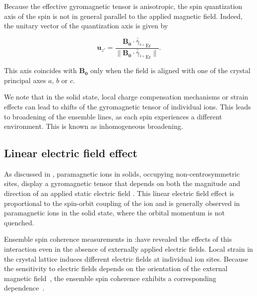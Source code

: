 Because the effective gyromagnetic tensor is anisotropic, the spin quantization axis of the spin is not in general parallel to the applied magnetic field. Indeed, the unitary vector of the quantization axis is given by

\begin{equation}
    \mathbf{u}_{z'} = \frac{\mathbf{B_0}\cdot \bar{\bar{\gamma}}_{^{3+}\text{Er}}}{\lVert \mathbf{B_0}\cdot \bar{\bar{\gamma}}_{^{3+}\text{Er}}\rVert}.
\end{equation}

This axis coincides with $\mathbf{B_0}$ only when the field is aligned with one of the crystal principal axes $a$, $b$ or $c$.

We note that in the solid state, local charge compensation mechanisms or strain effects can lead to shifts of the gyromagnetic tensor of individual ions. This leads to broadening of the ensemble lines, as each spin experiences a different environment. This is known as inhomogeneous broadening.

\subsection{Linear electric field effect}

As discussed in , paramagnetic ions in solids, occupying non-centrosymmetric sites, display a gyromagnetic tensor that depends on both the magnitude and direction of an applied static electric field . This linear electric field effect is proportional to the spin-orbit coupling of the ion and is generally observed in paramagnetic ions in the solid state, where the orbital momentum is not quenched. 

Ensemble spin coherence measurements in \Er:\Ca have revealed the effects of this interaction even in the absence of externally applied electric fields. Local strain in the crystal lattice induces different electric fields at individual ion sites. Because the sensitivity to electric fields depends on the orientation of the external magnetic field~, the ensemble spin coherence exhibits a corresponding dependence~.


